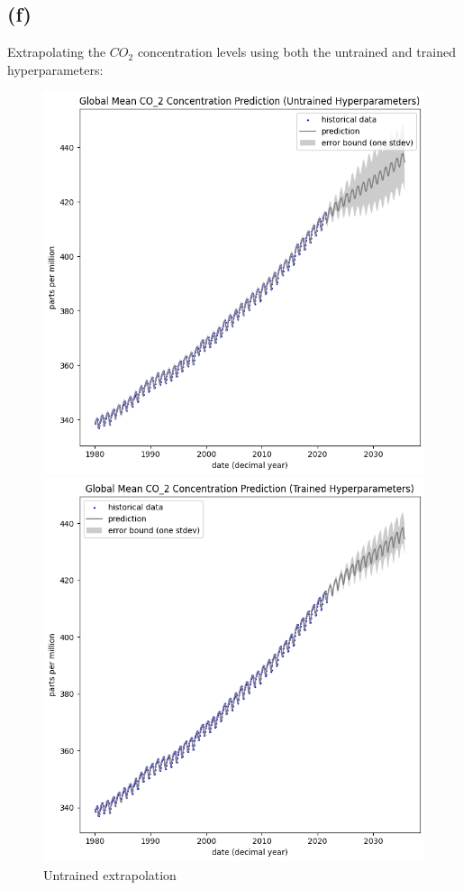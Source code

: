 \documentclass[12pt]{article}
\begin{document}
\newpage
\subsection*{(f)}
Extrapolating the $CO_2$ concentration levels using both the untrained and trained hyperparameters:

\begin{figure}[h]
\centering
\begin{minipage}{.5\textwidth}
  \centering
\includegraphics[scale=0.5]{outputs/q2/f-extrapolation-untrained}
\caption{Untrained extrapolation}
\label{fig:f-extrapolation-untrained}
\end{minipage}%
\begin{minipage}{.5\textwidth}
  \centering
\includegraphics[scale=0.5]{outputs/q2/f-extrapolation-trained}

\end{minipage}
\end{figure}
\end{document}
